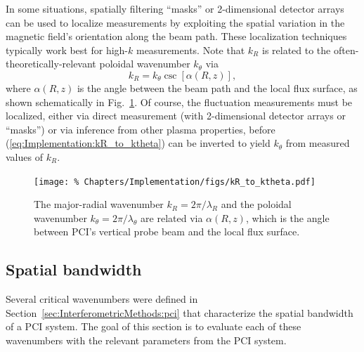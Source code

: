 In some situations, spatially filtering ``masks''
\cite{dorris_rsi09, dorris_phd, lin_rsi06} or
2-dimensional detector arrays
\cite{sanin_rsi04, tanaka_rsi16}
can be used to localize measurements
by exploiting the spatial variation
in the magnetic field's orientation along the beam path.
These localization techniques typically work best
for high-$k$ measurements.
Note that $k_R$ is related to the
often-theoretically-relevant poloidal wavenumber $k_{\theta}$ via
\begin{equation}
  k_R = k_{\theta} \csc[\alpha(R, z)],
  \label{eq:Implementation:kR_to_ktheta}
\end{equation}
where $\alpha(R, z)$ is the angle
between the beam path and the local flux surface,
as shown schematically in
Fig.~\ref{fig:Implementation:relating_kR_to_ktheta}.
Of course, the fluctuation measurements must be localized,
either via direct measurement
(with 2-dimensional detector arrays or ``masks'')
or via inference from other plasma properties,
before (\ref{eq:Implementation:kR_to_ktheta})
can be inverted to yield $k_{\theta}$
from measured values of $k_R$.

\begin{figure}
  \centering
  \texttt{[image: \%
    Chapters/Implementation/figs/kR\_to\_ktheta.pdf]}
  \caption[Relating $k_R$ to $k_{\theta}$]{%
    The major-radial wavenumber $k_R = 2 \pi / \lambda_R$ and
    the poloidal wavenumber $k_{\theta} = 2 \pi / \lambda_{\theta}$
    are related via $\alpha(R, z)$, which
    is the angle between PCI's vertical probe beam and
    the local flux surface.}
\label{fig:Implementation:relating_kR_to_ktheta}
\end{figure}


\subsection{Spatial bandwidth}
Several critical wavenumbers were defined in
Section~\ref{sec:InterferometricMethods:pci} that
characterize the spatial bandwidth of a PCI system.
The goal of this section is to evaluate each of these
wavenumbers with the relevant parameters from
the \diiid \space PCI system.

